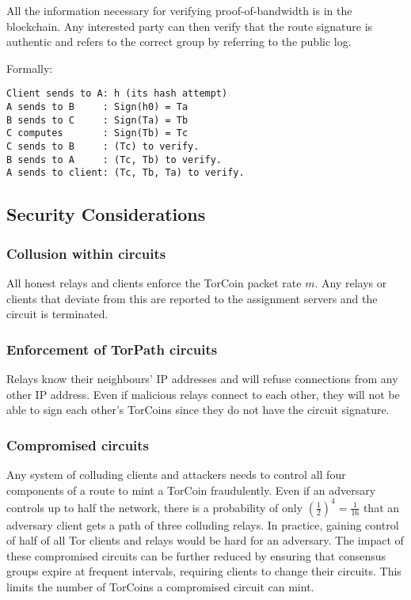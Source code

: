 All the information necessary for verifying proof-of-bandwidth is in the
blockchain. Any interested party can then verify that the route signature is
authentic and refers to the correct group by referring to the public log.

Formally:

\begin{verbatim}
Client sends to A: h (its hash attempt)
A sends to B     : Sign(h0) = Ta
B sends to C     : Sign(Ta) = Tb
C computes       : Sign(Tb) = Tc
C sends to B     : (Tc) to verify.
B sends to A     : (Tc, Tb) to verify.
A sends to client: (Tc, Tb, Ta) to verify.
\end{verbatim}

\subsection{Security Considerations}

\subsubsection{Collusion within circuits} All honest relays and clients
enforce the TorCoin packet rate $m$. Any relays or clients that deviate from this
are reported to the assignment servers and the circuit is terminated.

\subsubsection{Enforcement of TorPath circuits} Relays know their neighbours'
IP addresses and will refuse connections from any other IP address. Even if
malicious relays connect to each other, they will not be able to sign each
other's TorCoins since they do not have the circuit signature.

\subsubsection{Compromised circuits} Any system of colluding clients and
attackers needs to control all four components of a route to mint a TorCoin
fraudulently. Even if an adversary controls up to half the network, there is a
probability of only $(\frac{1}{2})^4 = \frac{1}{16}$ that an adversary client
gets a path of three colluding relays. In practice, gaining control of half of
all Tor clients and relays would be hard for an adversary. The impact of these
compromised circuits can be further reduced by ensuring that consensus groups
expire at frequent intervals, requiring clients to change their circuits. This
limits the number of TorCoins a compromised circuit can mint.

